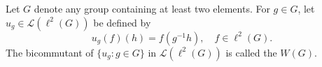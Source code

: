 Let $G$ denote any group containing at least two elements. For $g \in G$, let $u_g \in \mathcal{L}(\ell^2(G))$ be defined by
$$
u_g(f)(h) = f(g^{-1}h), \quad f \in \ell^2(G).
$$
The bicommutant of $\{u_g : g \in G\}$ in $\mathcal{L}(\ell^2(G))$ is called the  $W(G)$.
